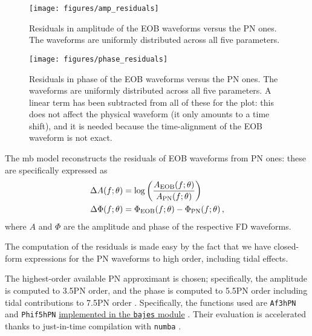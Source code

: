 \documentclass[main.tex]{subfiles}
\begin{document}
\begin{figure}[ht]
\centering
\texttt{[image: figures/amp\_residuals]}
\caption{Residuals in amplitude of the EOB waveforms versus the \ac{PN} ones. The waveforms are uniformly distributed across all five parameters. }
\label{fig:amp_residuals}
\end{figure}

\begin{figure}[ht]
\centering
\texttt{[image: figures/phase\_residuals]}
\caption{Residuals in phase of the \ac{EOB} waveforms versus the \ac{PN} ones. The waveforms are uniformly distributed across all five parameters.
A linear term has been subtracted from all of these for the plot: this does not affect the physical waveform (it only amounts to a time shift), and it is needed because the time-alignment of the \ac{EOB} waveform is not exact.}
\label{fig:phase_residuals}
\end{figure}

The \ac{mb} model reconstructs the residuals of \ac{EOB} waveforms from \ac{PN} ones: these are specifically expressed as 
%
\begin{subequations}
\begin{align} \label{eq:amplitude-phase-residuals}
\Delta A(f;\theta ) &= \log \qty(\frac{A _{\text{EOB}} (f;\theta )}{A _{\text{PN}} (f;\theta )}) \\
\Delta \Phi (f; \theta ) &= \Phi _{\text{EOB}} (f; \theta ) - \Phi _{\text{PN}} (f; \theta )
\,,
\end{align}
\end{subequations}
%
where \(A\) and \(\Phi \) are the amplitude and phase of the respective \ac{FD} waveforms. 

The computation of the residuals is made easy by the fact that we have closed-form expressions for the \ac{PN} waveforms to high order, including tidal effects.

The highest-order available \ac{PN} approximant is chosen; specifically, the amplitude is computed to 3.5PN order, and the phase is computed to 5.5PN order including tidal contributions to 7.5PN order \cite{favataSystematicParameterErrors2014}.
Specifically, the functions used are \texttt{Af3hPN} and \texttt{Phif5hPN} \href{https://github.com/matteobreschi/bajes/blob/stable/v0.1/bajes/obs/gw/approx/taylorf2.py}{implemented in the \texttt{bajes} module} \cite[]{breschiTtBajesBayesian2021}. Their evaluation is accelerated thanks to just-in-time compilation with \texttt{numba} \cite[]{lamNumbaLLVMbasedPython2015}.
\end{document}
